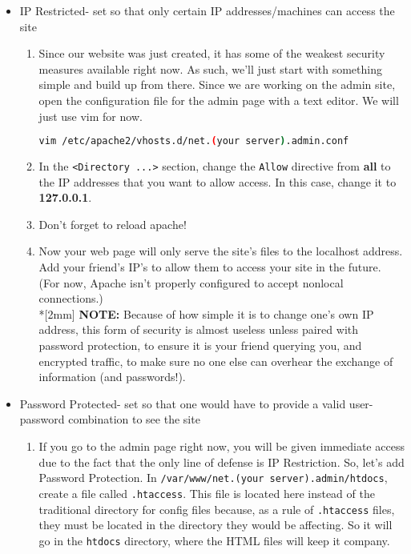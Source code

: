 \documentclass[11pt]{article}
\begin{document}
\begin {itemize}

  \item IP Restricted- set so that only certain IP addresses/machines can access the site
  
  \begin {enumerate}

    \item Since our website was just created, it has some of the weakest security measures available right now. As such, we'll just start with something simple and build up from there. Since we are working on the admin site, open the configuration file for the admin page with a text editor. We will just use vim for now.
    \begin{lstlisting}[basicstyle=\ttfamily, backgroundcolor = \color{lightgray}, language = bash, xleftmargin = 0cm, framexleftmargin = 1em, framexrightmargin = 6em, showstringspaces=false] 
vim /etc/apache2/vhosts.d/net.(your server).admin.conf
\end{lstlisting}
    
    \item In the \verb|<Directory ...>| section, change the \verb|Allow| directive from \textbf{all} to the IP addresses that you want to allow access. In this case, change it to \textbf{127.0.0.1}.
    
    \item Don't forget to reload apache!
    
    \item Now your web page will only serve the site's files to the localhost address. Add your friend's IP's to allow them to access your site in the future. (For now, Apache isn't properly configured to accept nonlocal connections.) 
    \\*[2mm] \textbf{NOTE:} Because of how simple it is to change one's own IP address, this form of security is almost useless unless paired with password protection, to ensure it is your friend querying you, and encrypted traffic, to make sure no one else can overhear the exchange of information (and passwords!).
  \end{enumerate}
  
  \item Password Protected- set so that one would have to provide a valid user-password combination to see the site
  \begin{enumerate}
  
    \item If you go to the admin page right now, you will be given immediate access due to the fact that the only line of defense is IP Restriction. So, let's add Password Protection. In \verb|/var/www/net.(your server).admin/htdocs|, create a file called \verb|.htaccess|. This file is located here instead of the traditional directory for config files because, as a rule of \verb|.htaccess| files, they must be located in the directory they would be affecting. So it will go in the \verb|htdocs| directory, where the HTML files will keep it company.
    

\end{enumerate}
\end{itemize}
\end{document}

